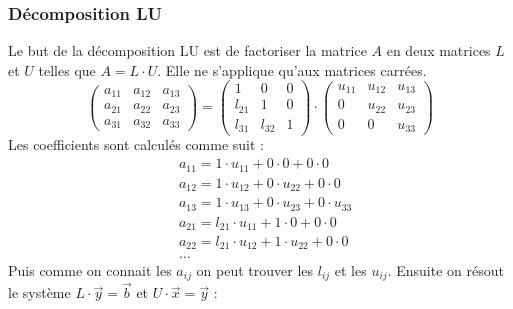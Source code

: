 \subsubsection*{Décomposition LU}
\noindent
Le but de la décomposition LU est de factoriser la matrice $A$ en
deux matrices $L$ et $U$ telles que $A=L\cdot U$. Elle ne s'applique qu'aux
matrices carrées.\\
\begin{equation}
    \begin{pmatrix}
        a_{11} & a_{12} & a_{13} \\
        a_{21} & a_{22} & a_{23} \\
        a_{31} & a_{32} & a_{33}
    \end{pmatrix}
    =
    \begin{pmatrix}
        1      & 0      & 0 \\
        l_{21} & 1      & 0 \\
        l_{31} & l_{32} & 1
    \end{pmatrix}
    \cdot
    \begin{pmatrix}
        u_{11} & u_{12} & u_{13} \\
        0      & u_{22} & u_{23} \\
        0      & 0      & u_{33}
    \end{pmatrix}
    \nonumber
\end{equation}
Les coefficients sont calculés comme suit :
\begin{equation}
    \begin{aligned}
         & a_{11}= 1 \cdot u_{11} + 0 \cdot 0 + 0 \cdot 0           \\
         & a_{12}= 1 \cdot u_{12} + 0 \cdot u_{22} + 0 \cdot 0      \\
         & a_{13}= 1 \cdot u_{13} + 0 \cdot u_{23} + 0 \cdot u_{33} \\
         & a_{21}= l_{21} \cdot u_{11} + 1 \cdot 0 + 0 \cdot 0      \\
         & a_{22}= l_{21} \cdot u_{12} + 1 \cdot u_{22} + 0 \cdot 0 \\
         & \dots
    \end{aligned}
    \nonumber
\end{equation}
Puis comme on connait les $a_{ij}$ on peut trouver les $l_{ij}$ et les $u_{ij}$.
Ensuite on résout le système $L\cdot \overrightarrow{y}=\overrightarrow{b}$ et
$U\cdot \overrightarrow{x}=\overrightarrow{y}$ :
